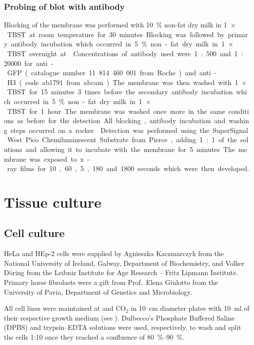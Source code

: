     \subsubsection{Probing of blot with antibody}
      Blocking of the membrane was performed with \SI{10}{\percent} non-fat dry milk in \SI{1}{$\times$} TBST
      at room temperature for 30 minutes. Blocking was followed by primary antibody
      incubation which occurred in \SI{5}{\percent} non-fat dry milk in \SI{1}{$\times$} TBST overnight at
      . Concentrations of antibody used were 1:500 and 1:20000 for anti-GFP
      (catalogue number 11 814 460 001 from Roche) and anti-H3 (code ab1791 from
      abcam). The membrane was then washed with \SI{1}{$\times$} TBST for 15 minutes 3 times
      before the secondary antibody incubation which occurred in \SI{5}{\percent} non-fat dry
      milk in \SI{1}{$\times$} TBST for 1 hour. The membrane was washed once more in the same
      conditions as before for the detection. All blocking, antibody incubation and
      washing steps occurred on a rocker.
      
      Detection was performed using the SuperSignal West Pico Chemiluminescent
      Substrate from Pierce, adding 1:1 of the solutions and allowing it to incubate
      with the membrane for 5 minutes. The membrane was exposed to x-ray films for
      10, 60, 5, 180 and 1800 seconds which were then developed.


\section{Tissue culture}
  \subsection{Cell culture}
    HeLa and HEp-2 cells were supplied by Agnieszka Kaczmarczyk from the
    National University of Ireland, Galway, Department of Biochemistry,
    and Volker D\"oring from the Leibniz Institute for Age Research -- Fritz Lipmann Institute.
    Primary horse fibrolasts were a gift from Prof.~Elena Giulotto from the
    University of Pavia, Department of Genetics and Microbiology.

    All cell lines were maintained at  and  CO$_2$ in \SI{10}{\cm}
    diameter plates with \SI{10}{\ml} of their respective growth medium (see ).
    Dulbecco's Phosphate Buffered
    Saline (DPBS) and trypsin--EDTA solutions were used, respectively, to wash
    and split the cells 1:10 once they reached a confluence of \SIrange{80}{90}{\percent}.

